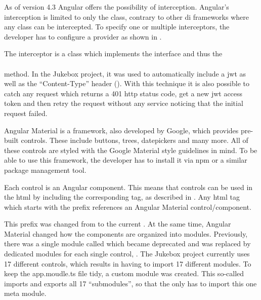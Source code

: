 
As of version 4.3 Angular offers the possibility of interception. Angular's interception is limited to only the  class, contrary to other \gls{di} frameworks where any class can be intercepted. To specify one or multiple interceptors, the developer has to configure a provider as shown in .


The interceptor is a class which implements the  interface and thus the \\ \hspace*{1cm}  \\ method. In the Jukebox project, it was used to automatically include a \gls{jwt} as well as the \enquote{Content-Type} header (). With this technique it is also possible to catch any request which returns a 401 \gls{http} status code, get a new \gls{jwt} access token and then retry the request without any service noticing that the initial request failed.




Angular Material is a framework, also developed by Google, which provides pre-built controls. These include buttons, trees, datepickers and many more. All of these controls are styled with the Google Material style guidelines in mind. To be able to use this framework, the developer has to install it via \gls{npm} or a similar package management tool. \cite{angularMaterial}

Each control is an Angular component. This means that controls can be used in the \gls{html} by including the corresponding tag, as described in . Any \gls{html} tag which starts with the  prefix references an Angular Material control/component.

This prefix was changed from  to the current . At the same time, Angular Material changed how the components are organized into modules. Previously, there was a single module called  which became deprecated and was replaced by dedicated modules for each single control, \zB {}. The Jukebox project currently uses 17 different controls, which results in having to import 17 different modules. To keep the app.moudle.ts file tidy, a custom module was created. This so-called  imports and exports all 17 \enquote{submodules}, so that the  only has to import this one meta module.


